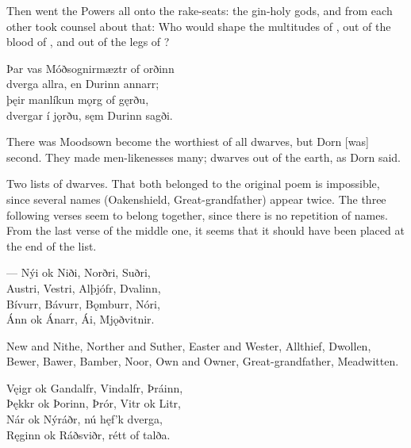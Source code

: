 \bvb Then went the Powers all onto the rake-seats: the gin-holy gods, and from each other took counsel about that: Who would shape the multitudes of , out of the blood of , and out of the legs of ?\footnotemark[1]\evb
{}

\bva Þar vas Móðsognir\footnotemark[1] \hld mæztr of orðinn \\%
dverga allra, \hld en Durinn annarr; \\%
þęir manlíkun \hld mǫrg of gęrðu, \\%
dvergar í jǫrðu, \hld sęm Durinn sagði.\eva
{}

\bvb There was Moodsown become the worthiest of all dwarves, but Dorn [was] second. They made men-likenesses many; dwarves out of the earth, as Dorn said.\footnotemark[1]\evb
{}\evb

\small{Two lists of dwarves. That both belonged to the original poem is impossible, since several names (Oakenshield, Great-grandfather) appear twice. The three following verses seem to belong together, since there is no repetition of names. From the last verse of the middle one, it seems that it should have been placed at the end of the list.}

\bva — Nýi ok Niði, \hld Norðri, Suðri, \\%
Austri, Vestri, \hld Alþjófr, Dvalinn, \\%
Bívurr, Bávurr, \hld Bǫmburr, Nóri, \\%
Ánn ok Ánarr, \hld Ái, Mjǫðvitnir.\footnotemark[1]\eva

\bvb New and Nithe, Norther and Suther, Easter and Wester, Allthief, Dwollen, Bewer, Bawer, Bamber, Noor, Own and Owner, Great-grandfather, Meadwitten.\evb

\bva Vęigr ok Gandalfr, \hld Vindalfr, Þráinn, \\%
Þękkr ok Þorinn, \hld Þrór, Vitr ok Litr, \\%
Nár ok Nýráðr, \hld nú hęf’k dverga, \\%
Ręginn ok Ráðsviðr, \hld rétt of talða.\eva

